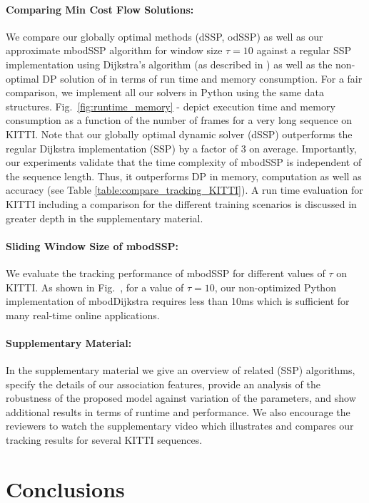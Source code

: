 \documentclass[10pt,twocolumn,letterpaper]{article}
\newcommand{\figref}[1]{Fig.~\ref{#1}}
\newcommand{\subfigref}[1]{Fig.~\subref*{#1}}
\begin{document}
\paragraph{Comparing Min Cost Flow Solutions:}
We compare our globally optimal methods (dSSP, odSSP) as well as our approximate mbodSSP algorithm for window size $\tau=10$ against a regular SSP implementation using Dijkstra's algorithm (as described in \cite{Cormen2001}) as well as the non-optimal DP solution of\cite{Pirsiavash2011CVPR} in terms of run time and memory consumption. 
For a fair comparison, we implement all our solvers in Python using the same data structures. 
\figref{fig:runtime_memory} - depict execution time and memory consumption as a function of the number of frames for a very long sequence on KITTI. 
Note that our globally optimal dynamic solver (dSSP) outperforms the regular Dijkstra implementation (SSP) by a factor of 3 on average.  
Importantly, our experiments validate that the time complexity of mbodSSP is independent of the sequence length. Thus, it outperforms DP \cite{Pirsiavash2011CVPR} in memory, computation as well as accuracy (see Table \ref{table:compare_tracking_KITTI}).
A run time evaluation for  KITTI  including a comparison for the different training scenarios is discussed in greater depth in the supplementary material.

\paragraph{Sliding Window Size of mbodSSP:}
We evaluate the tracking performance of mbodSSP for different values of $\tau$  on  KITTI. 
As shown in \subfigref{fig:runtime_memory:history},  for a value of $\tau=10$, our non-optimized Python implementation of mbodDijkstra requires less than 10ms which is sufficient for many real-time online applications.

\paragraph{Supplementary Material:}
In the supplementary material we give an overview of related (SSP) algorithms, specify the details of our association features, provide an analysis of the robustness of the proposed model against variation of the parameters, and show additional results in terms of runtime and performance. We also encourage the reviewers to watch the supplementary video which illustrates and compares our tracking results for several KITTI sequences. \section{Conclusions}
\end{document}
